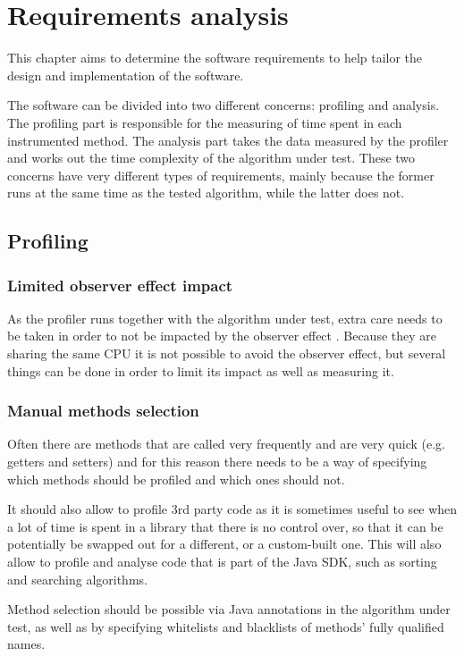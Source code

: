 \chapter{Requirements analysis}

This chapter aims to determine the software requirements to help tailor the design and implementation of the software.

\noindent The software can be divided into two different concerns: profiling and analysis. The profiling part is responsible for the measuring of time spent in each instrumented method. The analysis part takes the data measured by the profiler and works out the time complexity of the algorithm under test. These two concerns have very different types of requirements, mainly because the former runs at the same time as the tested algorithm, while the latter does not.

\section{Profiling}

\subsection{Limited observer effect impact}
As the profiler runs together with the algorithm under test, extra care needs to be taken in order to not be impacted by the observer effect \cite{MSH08}. Because they are sharing the same CPU it is not possible to avoid the observer effect, but several things can be done in order to limit its impact as well as measuring it.

\subsection{Manual methods selection}
Often there are methods that are called very frequently and are very quick (e.g. getters and setters) and for this reason there needs to be a way of specifying which methods should be profiled and which ones should not.

\noindent It should also allow to profile 3rd party code as it is sometimes useful to see when a lot of time is spent in a library that there is no control over, so that it can be potentially be swapped out for a different, or a custom-built one. This will also allow to profile and analyse code that is part of the Java SDK, such as sorting and searching algorithms.

\noindent Method selection should be possible via Java annotations in the algorithm under test, as well as by specifying whitelists and blacklists of methods' fully qualified names.

